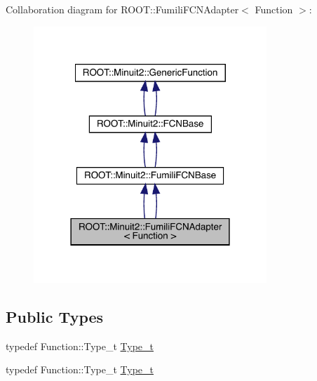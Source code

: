 Collaboration diagram for R\+O\+OT\+:\+:Fumili\+F\+C\+N\+Adapter$<$ Function $>$\+:\nopagebreak
\begin{figure}[H]
\begin{center}
\leavevmode
\includegraphics[width=249pt]{de/d14/classROOT_1_1Minuit2_1_1FumiliFCNAdapter__coll__graph}
\end{center}
\end{figure}
\subsection*{Public Types}
\begin{DoxyCompactItemize}
\item 
typedef Function\+::\+Type\+\_\+t \mbox{\hyperlink{classROOT_1_1Minuit2_1_1FumiliFCNAdapter_afce33892c378fb82c3209eda03824e11}{Type\+\_\+t}}
\item 
typedef Function\+::\+Type\+\_\+t \mbox{\hyperlink{classROOT_1_1Minuit2_1_1FumiliFCNAdapter_afce33892c378fb82c3209eda03824e11}{Type\+\_\+t}}
\end{DoxyCompactItemize}

